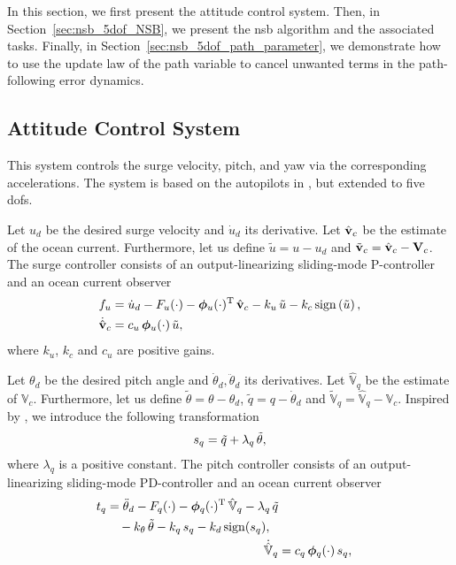 In this section, we first present the attitude control system.
Then, in Section~\ref{sec:nsb_5dof_NSB}, we present the \gls{nsb} algorithm and the associated tasks.
Finally, in Section~\ref{sec:nsb_5dof_path_parameter}, we demonstrate how to use the update law of the path variable to cancel unwanted terms in the path-following error dynamics.

\subsection{Attitude Control System}
\label{sec:nsb_5dof_ACS}
This system controls the surge velocity, pitch, and yaw via the corresponding accelerations.
The system is based on the autopilots in \cite{moe_LOS_2016}, but extended to five \glspl{dof}.

Let $u_d$ be the desired surge velocity and $\dot{u}_d$ its derivative.
Let $\hat{\mathbf{v}}_c$ be the estimate of the ocean current.
Furthermore, let us define $\tilde{u} = u - u_d$ and $\tilde{\mathbf{v}}_c = \hat{\mathbf{v}}_c - \mathbf{V}_c$.
The surge controller consists of an output-linearizing sliding-mode P-controller and an ocean current observer \vspace{-1mm}
\begin{align}
    f_u &= \dot{u}_d - F_u(\cdot) - \bs{\phi}_u(\cdot)\T\,\oceanhat - k_u\,\tilde{u} - k_c\,{\rm sign}\left(\tilde{u}\right), \label{eq:nsb_5dof_t_u} \\
    \dot{\hat{\ivel}}_c &= c_u\,\bs{\phi}_u(\cdot)\,\tilde{u}, \label{eq:nsb_5dof_V_hat_u} \vspace{-2mm}
\end{align}
where $k_u$, $k_c$ and $c_u$ are positive gains.

Let $\theta_d$ be the desired pitch angle and $\dot{\theta}_d, \ddot{\theta}_d$ its derivatives.
Let $\hat{\mathbb{V}}_q$ be the estimate of $\mathbb{V}_c$.
Furthermore, let us define $\tilde{\theta} = \theta - \theta_d$, $\tilde{q} = q - \dot{\theta}_d$ and $\tilde{\mathbb{V}}_q = \hat{\mathbb{V}}_q - \mathbb{V}_c$.
Inspired by \cite{moe_set-based_2017}, we introduce the following transformation \vspace{-1.5mm}
\begin{equation}
    s_q = \tilde{q} + \lambda_q\,\tilde{\theta}, \vspace{-2mm}
\end{equation}
where $\lambda_q$ is a positive constant.
The pitch controller consists of an output-linearizing sliding-mode PD-controller and an ocean current observer \vspace{-1mm}
\begin{align}
    \begin{split}
        t_q &= \ddot{\theta}_d - F_q(\cdot) - \bm{\phi}_q(\cdot)^{\mathrm{T}}\,\hat{\mathbb{V}}_q - \lambda_q\,\tilde{q} \\
        & \quad - k_{\theta}\,\tilde{\theta} - k_q\,s_q - k_d\,{\rm sign}(s_q), 
    \end{split} \label{eq:nsb_5dof_t_q} \\
    \dot{\hat{\mathbb{V}}}_q &= c_q\,\bm{\phi}_q(\cdot)\,s_q, \label{eq:nsb_5dof_V_hat_q}
\end{align}
\vspace{-5.5mm}

